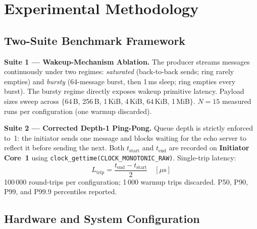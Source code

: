\documentclass[10pt,conference]{IEEEtran}
\begin{document}
\section{Experimental Methodology}

\subsection{Two-Suite Benchmark Framework}

\textbf{Suite 1 --- Wakeup-Mechanism Ablation.}
The producer streams messages continuously under two regimes:
\emph{saturated} (back-to-back sends; ring rarely empties) and
\emph{bursty} (64-message burst, then 1\,ms sleep; ring empties every burst).
The bursty regime directly exposes wakeup primitive latency.  Payload sizes
sweep across $\{$64\,B, 256\,B, 1\,KiB, 4\,KiB, 64\,KiB, 1\,MiB$\}$.
$N=15$ measured runs per configuration (one warmup discarded).

\textbf{Suite 2 --- Corrected Depth-1 Ping-Pong.}
Queue depth is strictly enforced to~1: the initiator sends one message and
blocks waiting for the echo server to reflect it before sending the next.
Both $t_{\text{start}}$ and $t_{\text{end}}$ are recorded on
\textbf{Initiator Core~1} using
\texttt{clock\_gettime(CLOCK\_MONOTONIC\_RAW)}.  Single-trip latency:
\[
  L_{\text{trip}} = \frac{t_{\text{end}} - t_{\text{start}}}{2} \quad [\mu\text{s}]
\]
100\,000 round-trips per configuration; 1\,000 warmup trips discarded.
P50, P90, P99, and P99.9 percentiles reported.

\subsection{Hardware and System Configuration}
\end{document}
